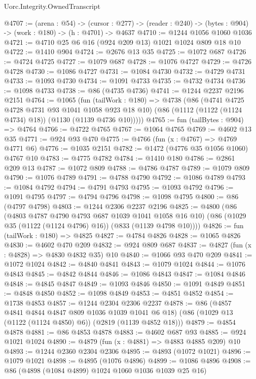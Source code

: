 \begin{lexlean}{Uorc.Integrity.OwnedTranscript}
\begin{coremodule}
@4707 := (arena : @54) ->
  (cursor : @277) -> (reader : @240) -> (bytes : @904) -> (work : @180) -> (h : @4701) -> @4637
@4710 := @1244 @1056 @1060 @1036
@4721 := @4710 @25 @6 @16 (@924 @209 @13) @1021 @1024 @809 @18 @10
@4722 := @1410 @904
@4724 := @2676 @13 @35
@4725 := @1072 @687
@4726 := @4724 @4725
@4727 := @1079 @687
@4728 := @1076 @4727
@4729 := @4726 @4728
@4730 := @1086 @4727
@4731 := @1084 @4730
@4732 := @4729 @4731
@4733 := @1093 @4730
@4734 := @1091 @4733
@4735 := @4732 @4734
@4736 := @1098 @4733
@4738 := @86 (@4735 @4736)
@4741 := @1244 @2237 @2196 @2151
@4764 := @1065
    (fun (tailWork : @180) =>
    @4738
      (@86
        (@4741 @4725 @4728 @4731 @93 @1041 @1058 @923 @18 @10)
        (@86 (@1112 (@1122 (@1124 @4734) @18)) (@1130 (@1139 @4736 @10)))))
@4765 := fun (tailBytes : @904) => @4764
@4766 := @4722 @4765
@4767 := @1064 @4765
@4769 := @4602 @13 @35
@4771 := @924 @93 @470
@4775 := @4766 (fun (x : @4767) => @4769 @4771 @6)
@4776 := @1035 @2151
@4782 := @1472 (@4776 @35 @1056 @1060) @4767 @10
@4783 := @4775 @4782
@4784 := @1410 @180
@4786 := @2861 @209 @13
@4787 := @1072 @809
@4788 := @4786 @4787
@4789 := @1079 @809
@4790 := @1076 @4789
@4791 := @4788 @4790
@4792 := @1086 @4789
@4793 := @1084 @4792
@4794 := @4791 @4793
@4795 := @1093 @4792
@4796 := @1091 @4795
@4797 := @4794 @4796
@4798 := @1098 @4795
@4800 := @86 (@4797 @4798)
@4803 := @1244 @2306 @2237 @2196
@4825 := @4800
    (@86
      (@4803 @4787 @4790 @4793 @687 @1039 @1041 @1058 @16 @10)
      (@86 (@1029 @35 (@1122 (@1124 @4796) @16)) (@833 (@1139 @4798 @10))))
@4826 := fun (tailWork : @180) => @4825
@4827 := @4784 @4826
@4828 := @1065 @4826
@4830 := @4602 @470 @209
@4832 := @924 @809 @687
@4837 := @4827 (fun (x : @4828) => @4830 @4832 @35) @10
@4840 := @1066 @93 @470 @209
@4841 := @1072 @1024
@4842 := @4840 @4841
@4843 := @1079 @1024
@4844 := @1076 @4843
@4845 := @4842 @4844
@4846 := @1086 @4843
@4847 := @1084 @4846
@4848 := @4845 @4847
@4849 := @1093 @4846
@4850 := @1091 @4849
@4851 := @4848 @4850
@4852 := @1098 @4849
@4853 := @4851 @4852
@4854 := @1738 @4853
@4857 := @1244 @2304 @2306 @2237
@4878 := @86
    (@4857 @4841 @4844 @4847 @809 @1036 @1039 @1041 @6 @18)
    (@86 (@1029 @13 (@1122 (@1124 @4850) @6)) (@2819 (@1139 @4852 @18)))
@4879 := @4854 @4878
@4881 := @86 @4853 @4878
@4883 := @4602 @687 @93
@4885 := @924 @1021 @1024
@4890 := @4879 (fun (x : @4881) => @4883 @4885 @209) @10
@4893 := @1244 @2360 @2304 @2306
@4895 := @4893 (@1072 @1021)
@4896 := @1079 @1021
@4898 := @4895 (@1076 @4896)
@4899 := @1086 @4896
@4908 := @86 (@4898 (@1084 @4899) @1024 @1060 @1036 @1039 @25 @16)

\end{coremodule}
\end{lexlean}
